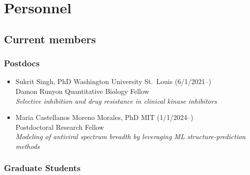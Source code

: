 \documentclass[10pt]{article}
\begin{document}
\eject


\section*{Personnel}

\subsection*{Current members}

\subsubsection*{Postdocs}

\begin{itemize}
  \item Sukrit Singh, PhD Washington University St.\ Louis (6/1/2021--) \\
  Damon Runyon Quantitative Biology Fellow\\
  \emph{Selective inhibition and drug resistance in clinical kinase inhibitors}

  \item Maria Castellanos Moreno Morales, PhD MIT (1/1/2024--) \\
  Postdoctoral Research Fellow \\
  \emph{Modeling of antiviral spectrum breadth by leveraging ML structure-prediction methods}

\end{itemize}

\subsubsection*{Graduate Students}
\end{document}
